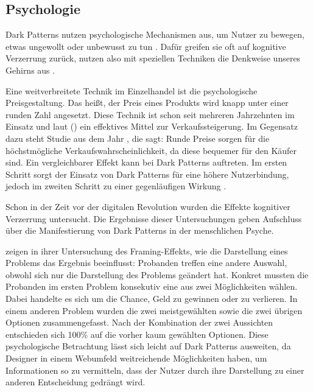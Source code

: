 \documentclass[conference,compsoc,final,a4paper]{IEEEtran}
\begin{document}
\subsection{Psychologie}
\label{chap:Psychologie}
Dark Patterns nutzen psychologische Mechanismen aus, um Nutzer zu bewegen, etwas ungewollt oder unbewusst zu tun \autocite{Brignull}. Dafür greifen sie oft auf kognitive Verzerrung zurück, nutzen also mit speziellen Techniken die Denkweise unseres Gehirns aus \autocite{Mathur2019}.

Eine weitverbreitete Technik im Einzelhandel ist die psychologische Preisgestaltung. Das heißt, der Preis eines Produkts wird knapp unter einer runden Zahl angesetzt. Diese Technik ist schon seit mehreren Jahrzehnten im Einsatz und laut \citeauthor{Bizer_2005} () \autocite{Bizer_2005} ein effektives Mittel zur Verkaufssteigerung. Im Gegensatz dazu steht \citeauthor{Wieseke_2015} \autocite{Wieseke_2015} Studie aus dem Jahr , die sagt: Runde Preise sorgen für die höchstmögliche Verkaufswahrscheinlichkeit, da diese bequemer für den Käufer sind. Ein vergleichbarer Effekt kann bei Dark Patterns auftreten. Im ersten Schritt sorgt der Einsatz von Dark Patterns für eine höhere Nutzerbindung, jedoch im zweiten Schritt zu einer gegenläufigen Wirkung \autocite{M.Bhoot2020}.

Schon in der Zeit vor der digitalen Revolution wurden die Effekte kognitiver Verzerrung untersucht. Die Ergebnisse dieser Untersuchungen geben Aufschluss über die Manifestierung von Dark Patterns in der menschlichen Psyche.

\citeauthor{Tversky453} \autocite{Tversky453} zeigen in ihrer Untersuchung des Framing-Effekts, wie die Darstellung eines Problems das Ergebnis beeinflusst: Probanden treffen eine andere Auswahl, obwohl sich nur die Darstellung des Problems geändert hat. Konkret mussten die Probanden im ersten Problem konsekutiv eine aus zwei Möglichkeiten wählen. Dabei handelte es sich um die Chance, Geld zu gewinnen oder zu verlieren. In einem anderen Problem wurden die zwei meistgewählten sowie die zwei übrigen Optionen zusammengefasst. Nach der Kombination der zwei Aussichten entschieden sich 100\% auf die vorher kaum gewählten Optionen. Diese psychologische Betrachtung lässt sich leicht auf Dark Patterns ausweiten, da Designer in einem Webumfeld weitreichende Möglichkeiten haben, um Informationen so zu vermitteln, dass der Nutzer durch ihre Darstellung zu einer anderen Entscheidung gedrängt wird.
\end{document}
